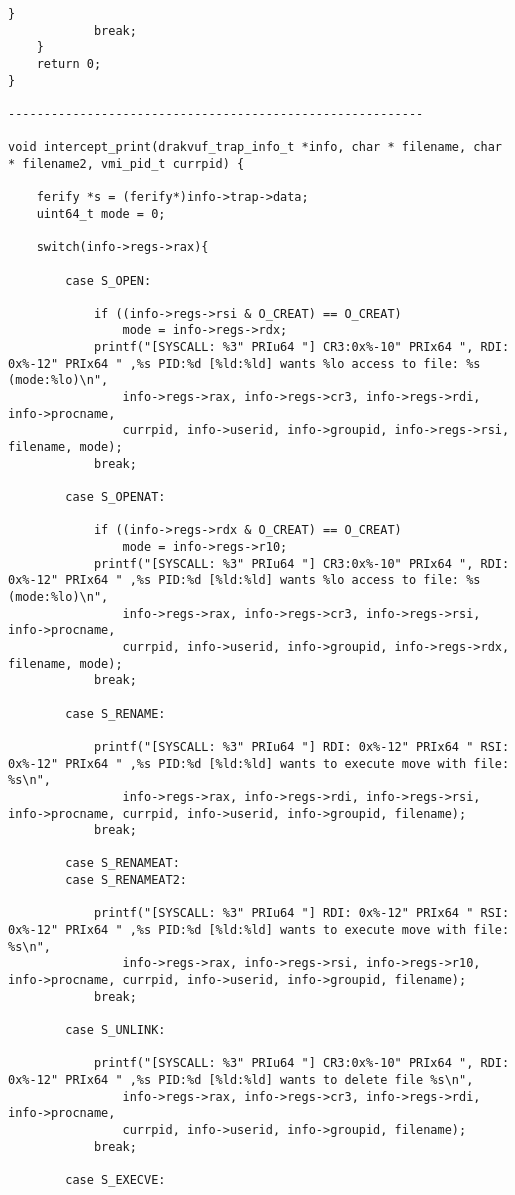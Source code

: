 {\begin{lstlisting}[style=CStyle]
			}
			break;
	}
	return 0;
}

----------------------------------------------------------

void intercept_print(drakvuf_trap_info_t *info, char * filename, char * filename2, vmi_pid_t currpid) {

	ferify *s = (ferify*)info->trap->data;
	uint64_t mode = 0;
	
	switch(info->regs->rax){
	
		case S_OPEN:
		
			if ((info->regs->rsi & O_CREAT) == O_CREAT)
				mode = info->regs->rdx;
			printf("[SYSCALL: %3" PRIu64 "] CR3:0x%-10" PRIx64 ", RDI: 0x%-12" PRIx64 " ,%s PID:%d [%ld:%ld] wants %lo access to file: %s (mode:%lo)\n",
				info->regs->rax, info->regs->cr3, info->regs->rdi, info->procname,
				currpid, info->userid, info->groupid, info->regs->rsi, filename, mode);
			break;	
		
		case S_OPENAT:
		
			if ((info->regs->rdx & O_CREAT) == O_CREAT)
				mode = info->regs->r10;
			printf("[SYSCALL: %3" PRIu64 "] CR3:0x%-10" PRIx64 ", RDI: 0x%-12" PRIx64 " ,%s PID:%d [%ld:%ld] wants %lo access to file: %s (mode:%lo)\n",
				info->regs->rax, info->regs->cr3, info->regs->rsi, info->procname,
				currpid, info->userid, info->groupid, info->regs->rdx, filename, mode);
			break;	
		
		case S_RENAME:
		
			printf("[SYSCALL: %3" PRIu64 "] RDI: 0x%-12" PRIx64 " RSI: 0x%-12" PRIx64 " ,%s PID:%d [%ld:%ld] wants to execute move with file: %s\n",
				info->regs->rax, info->regs->rdi, info->regs->rsi, info->procname, currpid, info->userid, info->groupid, filename);
			break;
		
		case S_RENAMEAT:
		case S_RENAMEAT2:
		
			printf("[SYSCALL: %3" PRIu64 "] RDI: 0x%-12" PRIx64 " RSI: 0x%-12" PRIx64 " ,%s PID:%d [%ld:%ld] wants to execute move with file: %s\n",
				info->regs->rax, info->regs->rsi, info->regs->r10, info->procname, currpid, info->userid, info->groupid, filename);
			break;
		
		case S_UNLINK:
		
			printf("[SYSCALL: %3" PRIu64 "] CR3:0x%-10" PRIx64 ", RDI: 0x%-12" PRIx64 " ,%s PID:%d [%ld:%ld] wants to delete file %s\n",
				info->regs->rax, info->regs->cr3, info->regs->rdi, info->procname,
				currpid, info->userid, info->groupid, filename);
			break;	
		
		case S_EXECVE:
		

\end{lstlisting}}
